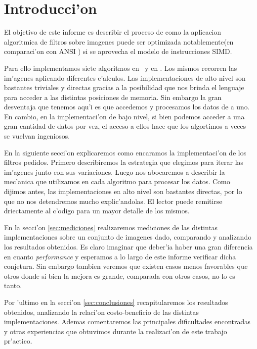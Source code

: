 \section{Introducci'on}

El objetivo de este informe es describir el proceso de como la aplicacion algoritmica de filtros sobre imagenes
puede ser optimizada notablemente(en comparaci'on con ANSI \C) si se aprovecha el modelo de instrucciones SIMD. 

Para ello implementamos siete algoritmos en \C\ y en \ass. Los mismos recorren las im'agenes aplicando diferentes c'alculos. Las implementaciones de alto nivel son bastantes triviales y directas gracias a la posibilidad que nos brinda el lenguaje para acceder a las distintas posiciones de memoria. Sin embargo la gran desventaja que tenemos aqu'i es que accedemos y procesamos los datos de a uno. En cambio, en la implementaci'on de bajo nivel, si bien podemos acceder a una gran cantidad de datos por vez, el acceso a ellos hace que los algortimos a veces se vuelvan ingeniosos. 

En la siguiente secci'on explicaremos como encaramos la implementaci'on de los filtros pedidos. Primero describiremos la estrategia que elegimos para iterar las im'agenes junto con sus variaciones. Luego nos abocaremos a describir la mec'anica que utilizamos en cada algoritmo para procesar los datos. Como dijimos antes, las implementaciones en alto nivel son bastantes directas, por lo que no nos detendremos mucho explic'andolas. El lector puede remitirse driectamente al c'odigo para un mayor detalle de los mismos.

En la secci'on \ref{sec:mediciones} realizaremos mediciones de las distintas implementaciones sobre un conjunto de imagenes dado, comparando y analizando los resultados obtenidos. Es claro imaginar que deber'ia haber una  gran diferencia en cuanto \textit{performance} y esperamos a lo largo de este informe verificar dicha conjetura. Sin embargo tambien veremos que existen casos menos favorables que otros donde si bien la mejora es grande, comparada con otros casos, no lo es tanto. 

Por 'ultimo en la secci'on \ref{sec:conclusiones} recapitularemos los resultados obtenidos, analizando la relaci'on costo-beneficio de las distintas implementaciones. Ademas comentaremos las principales dificultades encontradas y otras experiencias que obtuvimos durante la realizaci'on de este trabajo pr'actico.